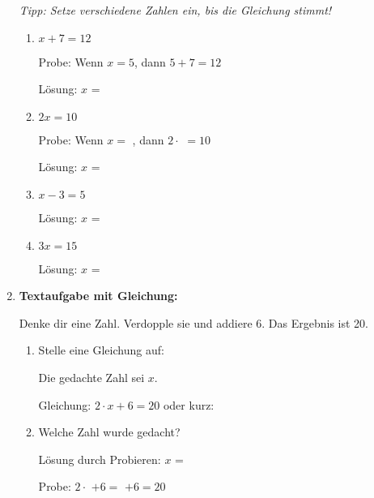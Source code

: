 \begin{enumerate}[resume, label=\arabic*.]
    \textit{Tipp: Setze verschiedene Zahlen ein, bis die Gleichung stimmt!}

    \begin{enumerate}[label=\alph*)]
        \item $x + 7 = 12$ 

        Probe: Wenn $x = 5$, dann $5 + 7 = 12$

        Lösung: $x$ = \underline{\hspace{2cm}}

        \item $2x = 10$ 

        Probe: Wenn $x = $ \underline{\hspace{1cm}}, dann $2 \cdot$ \underline{\hspace{1cm}} $= 10$

        Lösung: $x$ = \underline{\hspace{2cm}}

        \item $x - 3 = 5$ 

        Lösung: $x$ = \underline{\hspace{2cm}}

        \item $3x = 15$ 

        Lösung: $x$ = \underline{\hspace{2cm}}
    \end{enumerate}

    \vspace{0.5cm}

    \item \textbf{Textaufgabe mit Gleichung:}

    Denke dir eine Zahl. Verdopple sie und addiere 6. Das Ergebnis ist 20.

    \begin{enumerate}[label=\alph*)]
        \item Stelle eine Gleichung auf: 

        Die gedachte Zahl sei $x$.

        Gleichung: $2 \cdot x + 6 = 20$ oder kurz: \underline{\hspace{4cm}}

        \item Welche Zahl wurde gedacht? 

        Lösung durch Probieren: $x$ = \underline{\hspace{2cm}}

        Probe: $2 \cdot$ \underline{\hspace{1cm}} $+ 6 = $ \underline{\hspace{1cm}} $+ 6 = 20$
    \end{enumerate}
\end{enumerate}